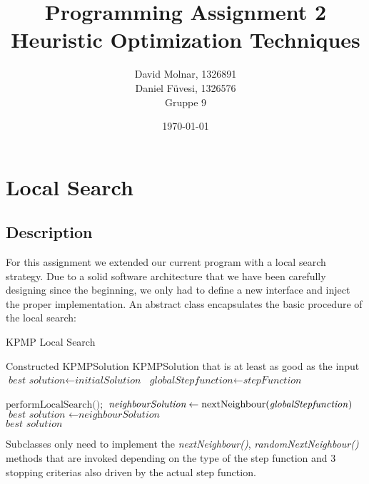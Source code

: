 \documentclass[11pt]{article}
\title{Programming Assignment 2\\ \vspace{10px} \large Heuristic Optimization Techniques}
\author{David Molnar, 1326891\\ Daniel Füvesi, 1326576\\Gruppe 9}
\date{\today}
\begin{document}
\lstset{language=Java}
\maketitle
 
\section{Local Search}
\subsection{Description}

\hspace{0.5cm}For this assignment we extended our current program with a local search strategy. Due to a solid software architecture that we have been carefully designing since the beginning, we only had to define a new interface and inject the proper implementation. An abstract class encapsulates the basic procedure of the local search: 
\begin{algorithm}
	\caption{KPMP Local Search}\label{euclid}
	\begin{algorithmic}[1]
		\Require Constructed KPMPSolution
		\Ensure KPMPSolution that is at least as good as the input
		\State $\textit{best solution} \gets \textit{initialSolution}$
		\State $\textit{globalStepfunction} \gets \textit{stepFunction}$
		
		\Return $\text{performLocalSearch()};$
		\EndFunction
		\newline
		\Do 
		\State $\textit{neighbourSolution} \gets \text{nextNeighbour(\textit{globalStepfunction})}$
		\State $\textit{best solution } \gets \textit{neighbourSolution}$
		\EndIf
		 \\
		\Return $\textit{best solution}$
		\EndFunction
	
	\end{algorithmic}
\end{algorithm}

Subclasses only need to implement the \textit{nextNeighbour()}, \textit{randomNextNeighbour()} methods that are invoked depending on the type of the step function and 3 stopping criterias also driven by the actual step function.
\pagebreak
\end{document}

